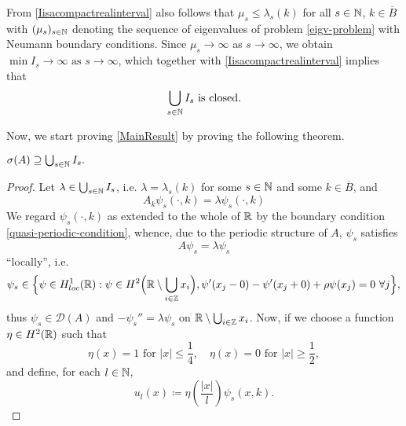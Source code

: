 From \eqref{Iisacompactrealinterval} also follows that $\mu_{s} \leq \lambda_{s}(k)$ for all $s \in \mathbb{N}$, $k \in \overline{B}$ with $(\mu_{s})_{s \in \mathbb{N}}$ denoting the sequence of eigenvalues of problem \eqref{eigv-problem} with Neumann boundary conditions. Since $\mu_{s} \rightarrow \infty$ as $s \rightarrow \infty$, we obtain $\min I_{s} \rightarrow \infty \text{ as } s \rightarrow \infty$, which together with \eqref{Iisacompactrealinterval} implies that %
	\begin{equation}
		\bigcup_{s \in \mathbb{N}} I_{s} \text{ is closed.} \label{UIclosed}
	\end{equation}
	
Now, we start proving \eqref{MainResult} by proving the following theorem.

\begin{theorem} \label{4.1:thm-MainResult.FirstInclusion}
	$\sigma(A) \supseteq \bigcup_{s \in \mathbb{N}} I_{s}.$
	
	\begin{proof}
		Let $\lambda \in \bigcup_{s \in \mathbb{N}} I_{s}$, i.e. $\lambda = \lambda_{s}(k)$ for some $s \in \mathbb{N}$ and some $k \in \overline{B}$, and 
		\begin{equation}
			A_{k} \psi_{s}(\cdot, k) = \lambda \psi_{s}(\cdot, k) \label{firstinclusion-firstequation} 
		\end{equation} 
		We regard $\psi_{s}(\cdot, k)$ as extended to the whole of $\mathbb{R}$ by the boundary condition \eqref{quasi-periodic-condition}, whence, due to the periodic structure of $A$, $\psi_{s}$ satisfies %
		\[ A \psi_{s} = \lambda \psi_{s} \]
		\enquote{locally}, i.e. 
		\[ \psi_{s} \in \Big\{ \psi \in  H^{1}_{loc}(\mathbb{R}) : \psi \in H^{2}\Big(\mathbb{R} \setminus \bigcup_{i \in \mathbb{Z}} x_{i} \Big), \psi'(x_{j} - 0) - \psi'(x_{j} + 0) + \rho  \psi(x_{j}) = 0 ~\forall j \Big\}, \]
		thus $\psi_{s} \in \mathcal{D}(A)$ and  $ -\psi_{s}'' = \lambda \psi_{s}$ on $\mathbb{R} \setminus \bigcup_{i \in \mathbb{Z}} x_{i}$. Now, if we choose a function $\eta \in H^{2}(\mathbb{R})$ such that 
			\begin{equation}
				\eta(x) = 1 \text{ for } |x| \leq \frac{1}{4}, \quad \eta(x) = 0 \text{ for } |x| \geq \frac{1}{2}, \label{eta}
			\end{equation} 
		and define, for each $l \in \mathbb{N}$,
			\[ u_{l}(x) \coloneqq \eta\left(\frac{|x|}{l}\right) \psi_{s}(x, k). \]


\end{proof}
\end{theorem}
